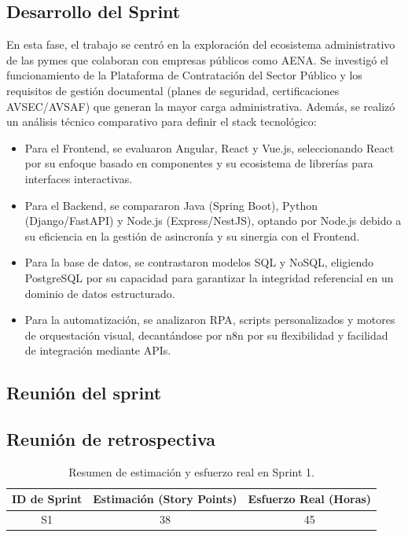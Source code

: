 \documentclass[12pt, a4paper]{book}
\begin{document}
\subsection{Desarrollo del Sprint}
En esta fase, el trabajo se centró en la exploración del ecosistema administrativo de las pymes que colaboran con empresas públicos como AENA. Se investigó el funcionamiento de la Plataforma de Contratación del Sector Público y los requisitos de gestión documental (planes de seguridad, certificaciones AVSEC/AVSAF) que generan la mayor carga administrativa.
Además, se realizó un análisis técnico comparativo para definir el stack tecnológico:
\begin{itemize}
    \item Para el Frontend, se evaluaron Angular, React y Vue.js, seleccionando React por su enfoque basado en componentes y su ecosistema de librerías para interfaces interactivas.
    \item Para el Backend, se compararon Java (Spring Boot), Python (Django/FastAPI) y Node.js (Express/NestJS), optando por Node.js debido a su eficiencia en la gestión de asincronía y su sinergia con el Frontend.
    \item Para la base de datos, se contrastaron modelos SQL y NoSQL, eligiendo PostgreSQL por su capacidad para garantizar la integridad referencial en un dominio de datos estructurado.
    \item Para la automatización, se analizaron RPA, scripts personalizados y motores de orquestación visual, decantándose por n8n por su flexibilidad y facilidad de integración mediante APIs.
\end{itemize}
\subsection{Reunión del sprint}
\subsection{Reunión de retrospectiva}
\begin{table}[H]
    \centering
    \caption{Resumen de estimación y esfuerzo real en Sprint 1.}
    \label{tab:esfuerzo_s1}
    \begin{tabular}{|c|c|c|}
        \hline
        \textbf{ID de Sprint} & \textbf{Estimación (Story Points)} & \textbf{Esfuerzo Real (Horas)} \\ \hline
        S1 & 38 & 45 \\ \hline %
    \end{tabular}
\end{table}
\end{document}
